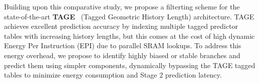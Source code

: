 \documentclass[11pt,a4paper,twocolumn]{article}
\begin{document}


Building upon this comparative study, we propose a filterting scheme for the state-of-the-art \textbf{TAGE}~\cite{seznec2006case} (Tagged Geometric History Length) architecture. TAGE achieves excellent prediction accuracy by indexing multiple tagged predictor tables with increasing history lengths, but this comes at the cost of high dynamic Energy Per Instruction (EPI) due to parallel SRAM lookups. To address this energy overhead, we propose to identify highly biased or stable branches and predict them using simpler components, dynamically bypassing the TAGE tagged tables to minimize energy consumption and Stage 2 prediction latency.
\end{document}
